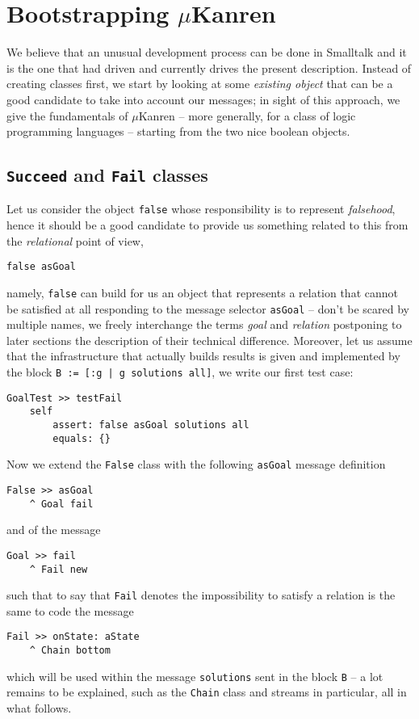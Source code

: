 \documentclass[a4paper,11pt]{article}
\begin{document}
\section{Bootstrapping $\mu$Kanren}
\label{sec:bootstrapping}

We believe that an unusual development process can be done in Smalltalk and it
is the one that had driven and currently drives the present description.
Instead of creating classes first, we start by looking at some \textit{existing
object} that can be a good candidate to take into account our messages; in
sight of this approach, we give the fundamentals of $\mu$Kanren -- more
generally, for a class of logic programming languages -- starting from the two
nice boolean objects.

\subsection{\texttt{Succeed} and \texttt{Fail} classes}

Let us consider the object \Verb|false| whose responsibility is to represent
\textit{falsehood}, hence it should be a good candidate to provide us something
related to this from the \textit{relational} point of view,
\begin{verbatim}
false asGoal
\end{verbatim}
namely, \Verb|false| can build for us an object that represents a relation that
cannot be satisfied at all responding to the message selector \Verb|asGoal| --
don't be scared by multiple names, we freely interchange the terms
\textit{goal} and \textit{relation} postponing to later sections the
description of their technical difference. Moreover, let us
assume that the infrastructure that actually builds results is given and implemented
by the block \texttt{B := [:g | g solutions all]}, we write our first test case:
\begin{verbatim}
GoalTest >> testFail
    self
        assert: false asGoal solutions all
        equals: {}
\end{verbatim}
Now we extend the \Verb|False| class with the following \Verb|asGoal| message
definition
\begin{verbatim}
False >> asGoal
    ^ Goal fail
\end{verbatim}
and of the message
\begin{verbatim}
Goal >> fail
    ^ Fail new
\end{verbatim}
such that to say that \verb|Fail| denotes the impossibility to satisfy a relation
is the same to code the message
\begin{verbatim}
Fail >> onState: aState
    ^ Chain bottom
\end{verbatim}
which will be used within the message \Verb|solutions| sent in the block
\Verb|B| -- a lot remains to be explained, such as the \Verb|Chain| class and
streams in particular, all in what follows.
\end{document}
